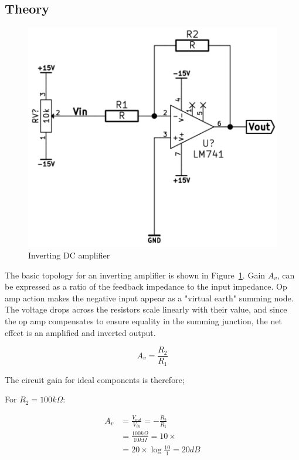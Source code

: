 \documentclass[11pt,a4paper]{article}
\begin{document}
\subsection{Theory}\label{invDC-theory}

\begin{figure}[htbp]
    \centering
        \includegraphics[scale=0.5]{img/invDCamp.png}
    \caption{Inverting DC amplifier}
    \label{fig:invDCamp}
\end{figure}

The basic topology for an inverting amplifier is shown in
Figure~\ref{fig:invDCamp}.  Gain $A_v$, can be expressed as a ratio of the
feedback impedance to the input impedance. Op amp action makes the negative
input appear as a "virtual earth" summing node. The voltage drops across the
resistors scale linearly with their value, and since the op amp compensates to
ensure equality in the summing junction, the net effect is an amplified and
inverted output.

\begin{equation}
    A_v = \frac{R_2}{R_1}
\end{equation}

The circuit gain for ideal components is therefore;

For $R_2 = 100k\Omega$:

\begin{align} 
A_v     &= \frac{V_{out}}{V_{in}} = -\frac{R_2}{R_1}\\
        &= \frac{100k\Omega}{10k\Omega} = 10\times\\
        &= 20 \times \log{\frac{10}{1}} = 20dB  
\end{align}
\end{document}
